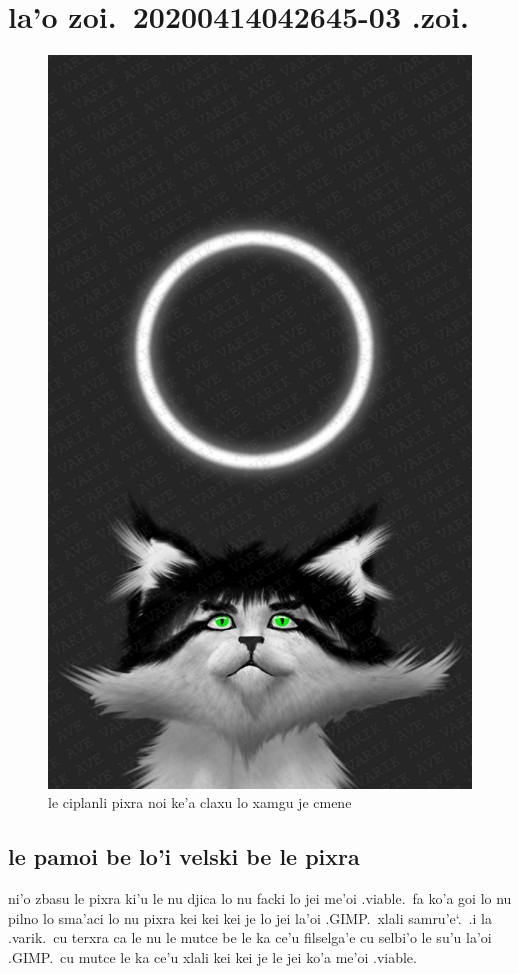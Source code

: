 \documentclass{report}
\newcommand\sds{\spacefactor\sfcode`.\ \space}
\begin{document}
\chapter{la'o zoi.\ 20200414042645-03 .zoi.}
\begin{figure}[ht]
	\centering
	\includegraphics[keepaspectratio, width=\textwidth, height=0.75\textheight]{20200414042645-03/20200414042645-03.jpg}
	\caption[center]{le ciplanli pixra noi ke'a claxu lo xamgu je cmene}
\end{figure}
\section{le pamoi be lo'i velski be le pixra}
ni'o zbasu le pixra ki'u le nu djica lo nu facki lo jei me'oi .viable.\ fa ko'a goi lo nu pilno lo sma'aci lo nu pixra kei kei kei je lo jei la'oi .GIMP.\ xlali samru'e\sds  .i la .varik.\ cu terxra ca le nu le mutce be le ka ce'u filselga'e cu selbi'o le su'u la'oi .GIMP.\ cu mutce le ka ce'u xlali kei kei je le jei ko'a me'oi .viable.
\end{document}
